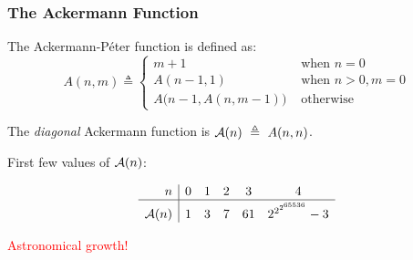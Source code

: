 \begin{frame}
\frametitle{The Ackermann Function}
	
	The Ackermann-P\'eter function is defined as:
	\begin{equation*}
	A(n, m) \triangleq \begin{cases}
	m + 1 & \text{ when } n = 0 \\
	A(n-1, 1) & \text{ when } n > 0, m = 0 \\
	A\big(n-1, A(n, m-1)\big) & \text{ otherwise}
	\end{cases}
	\end{equation*}
	
	\pause 
	The \emph{diagonal} Ackermann function is $\mathcal{A}(n)~\triangleq~A(n, n)$.
	
	\bigskip
	
	\pause 
	First few values of $\mathcal{A}(n)$:
	
  \begin{minipage}{0.5\linewidth}
		\begin{equation*}
	\begin{array}{r|ccccc}
	 n & 0 & 1 & 2 & 3 & 4 \\ \hline
	 \Ack(n) & 1 & 3 & 7 & 61 & 2^{2^{2^{65536}}} - 3 \topspace{3pt}
	\end{array}
	\end{equation*}
  \end{minipage}
  \quad \pause 
  \begin{minipage}{0.4\linewidth}
  	\textcolor{red}{Astronomical growth!}
  \end{minipage}

\end{frame}


